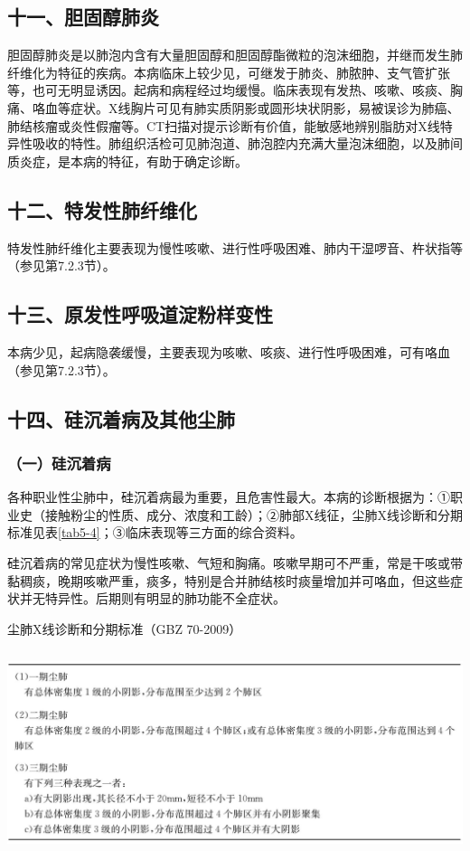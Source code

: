 \subsection{十一、胆固醇肺炎}

胆固醇肺炎是以肺泡内含有大量胆固醇和胆固醇酯微粒的泡沫细胞，并继而发生肺纤维化为特征的疾病。本病临床上较少见，可继发于肺炎、肺脓肿、支气管扩张等，也可无明显诱因。起病和病程经过均缓慢。临床表现有发热、咳嗽、咳痰、胸痛、咯血等症状。X线胸片可见有肺实质阴影或圆形块状阴影，易被误诊为肺癌、肺结核瘤或炎性假瘤等。CT扫描对提示诊断有价值，能敏感地辨别脂肪对X线特异性吸收的特性。肺组织活检可见肺泡道、肺泡腔内充满大量泡沫细胞，以及肺间质炎症，是本病的特征，有助于确定诊断。

\subsection{十二、特发性肺纤维化}

特发性肺纤维化主要表现为慢性咳嗽、进行性呼吸困难、肺内干湿啰音、杵状指等（参见第7.2.3节）。

\subsection{十三、原发性呼吸道淀粉样变性}

本病少见，起病隐袭缓慢，主要表现为咳嗽、咳痰、进行性呼吸困难，可有咯血（参见第7.2.3节）。

\subsection{十四、硅沉着病及其他尘肺}

\subsubsection{（一）硅沉着病}

各种职业性尘肺中，硅沉着病最为重要，且危害性最大。本病的诊断根据为：①职业史（接触粉尘的性质、成分、浓度和工龄）；②肺部X线征，尘肺X线诊断和分期标准见表\ref{tab5-4}；③临床表现等三方面的综合资料。

硅沉着病的常见症状为慢性咳嗽、气短和胸痛。咳嗽早期可不严重，常是干咳或带黏稠痰，晚期咳嗽严重，痰多，特别是合并肺结核时痰量增加并可咯血，但这些症状并无特异性。后期则有明显的肺功能不全症状。

\begin{table}[htbp]
\centering
\caption{尘肺X线诊断和分期标准（GBZ 70-2009）}
\label{tab5-4}
\includegraphics[width=5.86458in,height=2.34375in]{./images/Image00047.jpg}
\end{table}

